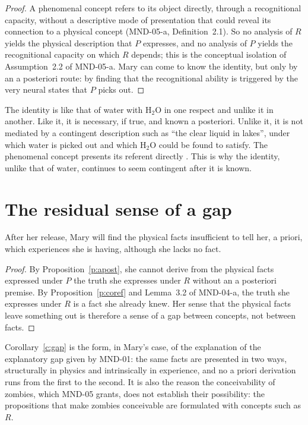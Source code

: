 \documentclass{situationist-preprint}
\begin{document}
\begin{proof}
A phenomenal concept refers to its object directly, through a recognitional capacity, without a descriptive mode of presentation that could reveal its connection to a physical concept (MND-05-a, Definition~2.1). So no analysis of $R$ yields the physical description that $P$ expresses, and no analysis of $P$ yields the recognitional capacity on which $R$ depends; this is the conceptual isolation of Assumption~2.2 of MND-05-a. Mary can come to know the identity, but only by an a posteriori route: by finding that the recognitional ability is triggered by the very neural states that $P$ picks out.
\end{proof}

The identity is like that of water with H$_2$O in one respect and unlike it in another. Like it, it is necessary, if true, and known a posteriori. Unlike it, it is not mediated by a contingent description such as \enquote{the clear liquid in lakes}, under which water is picked out and which H$_2$O could be found to satisfy. The phenomenal concept presents its referent directly \citep{Loar1990}. This is why the identity, unlike that of water, continues to seem contingent after it is known.

\section{The residual sense of a gap}

\begin{corollary}\label{c:gap}
After her release, Mary will find the physical facts insufficient to tell her, a priori, which experiences she is having, although she lacks no fact.
\end{corollary}

\begin{proof}
By Proposition~\ref{p:apost}, she cannot derive from the physical facts expressed under $P$ the truth she expresses under $R$ without an a posteriori premise. By Proposition~\ref{p:coref} and Lemma~3.2 of MND-04-a, the truth she expresses under $R$ is a fact she already knew. Her sense that the physical facts leave something out is therefore a sense of a gap between concepts, not between facts.
\end{proof}

Corollary~\ref{c:gap} is the form, in Mary's case, of the explanation of the explanatory gap given by MND-01: the same facts are presented in two ways, structurally in physics and intrinsically in experience, and no a priori derivation runs from the first to the second. It is also the reason the conceivability of zombies, which MND-05 grants, does not establish their possibility: the propositions that make zombies conceivable are formulated with concepts such as $R$.
\end{document}
